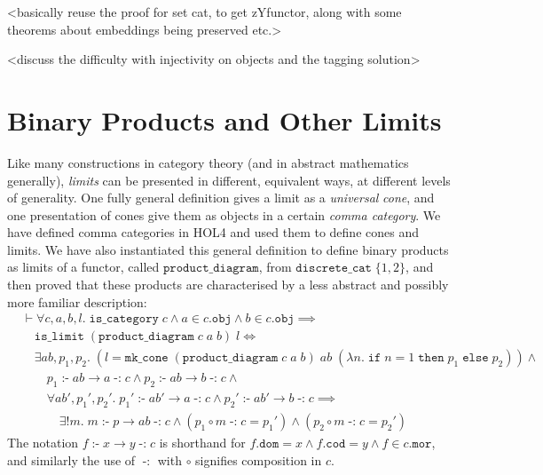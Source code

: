 \documentclass[twoside,titlepage,11pt]{article}
\begin{document}
<basically reuse the proof for set cat, to get zYfunctor, along with some theorems about embeddings being preserved etc.>

<discuss the difficulty with injectivity on objects and the tagging solution>
\section{Binary Products and Other Limits}%
\label{limits}
Like many constructions in category theory (and in abstract mathematics generally), \emph{limits} can be presented in different, equivalent ways, at different levels of generality.
One fully general definition gives a limit as a \emph{universal} \emph{cone}, and one presentation of cones give them as objects in a certain \emph{comma category}.
We have defined comma categories in HOL4 and used them to define cones and limits.
We have also instantiated this general definition to define binary products as limits of a functor, called $\mathtt{product\_diagram}$, from $\mathtt{discrete\_cat}\;\{1,2\}$, and then proved that these products are characterised by a less abstract and possibly more familiar description:
\begin{align*}
&\vdash\forall{c,a,b,l}.\;\mathtt{is\_category}\;c\land a\in c.\mathtt{obj}\land b \in c.\mathtt{obj}\implies\\
&\quad\mathtt{is\_limit}\;(\mathtt{product\_diagram}\;c\;a\;b)\;l\iff\\
&\quad\exists{ab,p_1,p_2}.\;(l = \mathtt{mk\_cone}\;(\mathtt{product\_diagram}\;c\;a\;b)\;ab\;(\lambda{n}.\; \mathtt{if}\;n = 1\;\mathtt{then}\;p_1\;\mathtt{else}\;p_2))\land{}\\
&\quad\quad p_1\operatorname{\mathtt{:-}}ab \to a\operatorname{\mathtt{-:}}c\land p_2\operatorname{\mathtt{:-}}ab \to b\operatorname{\mathtt{-:}}c\land{}\\
&\quad\quad\forall{ab',p_1',p_2'}.\;
p_1'\operatorname{\mathtt{:-}} ab' \to a \operatorname{\mathtt{-:}}c\land
p_2'\operatorname{\mathtt{:-}} ab' \to b \operatorname{\mathtt{-:}}c\implies\\
&\quad\quad\quad\exists!{m}.\;
m\operatorname{\mathtt{:-}}p\to ab\operatorname{\mathtt{-:}}c\land(p_1\circ m\operatorname{\mathtt{-:}}c = p_1')\land(p_2\circ m\operatorname{\mathtt{-:}}c = p_2')
\end{align*}
The notation $f\operatorname{\mathtt{:-}}x\to y\operatorname{\mathtt{-:}}c$ is shorthand for $f.\mathtt{dom}=x\land f.\mathtt{cod}=y\land f\in c.\mathtt{mor}$, and similarly the use of $\operatorname{\mathtt{-:}}$ with $\circ$ signifies composition in $c$.
\end{document}
